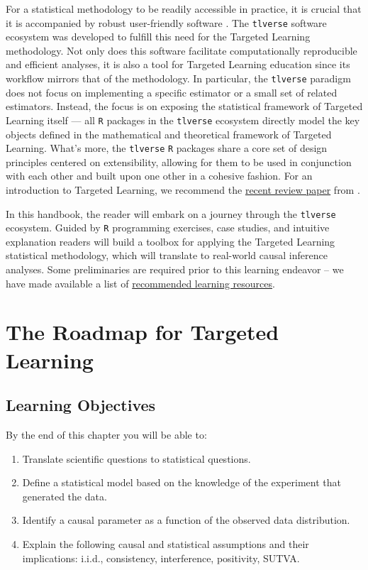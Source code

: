 \documentclass[12pt, krantz2,]{krantz}
\providecommand{\tightlist}{%
  \setlength{\itemsep}{0pt}\setlength{\parskip}{0pt}}
\theoremstyle{definition}
\theoremstyle{definition}
\theoremstyle{definition}
\newcommand{\1}{\mathbbm{1}}
\begin{document}
For a statistical methodology to be readily accessible in practice, it is
crucial that it is accompanied by robust user-friendly software
\citep{pullenayegum2016knowledge, stromberg2004write}. The \texttt{tlverse} software
ecosystem was developed to fulfill this need for the Targeted Learning
methodology. Not only does this software facilitate computationally reproducible
and efficient analyses, it is also a tool for Targeted Learning education since
its workflow mirrors that of the methodology. In particular, the \texttt{tlverse}
paradigm does not focus on implementing a specific estimator or a small set of
related estimators. Instead, the focus is on exposing the statistical framework
of Targeted Learning itself --- all \texttt{R} packages in the \texttt{tlverse} ecosystem
directly model the key objects defined in the mathematical and theoretical
framework of Targeted Learning. What's more, the \texttt{tlverse} \texttt{R} packages share a
core set of design principles centered on extensibility, allowing for them to be
used in conjunction with each other and built upon one other in a cohesive
fashion. For an introduction to Targeted Learning, we recommend the \href{https://arxiv.org/abs/2006.07333}{recent
review paper} from \citet{coyle2021targeted}.

In this handbook, the reader will embark on a journey through the \texttt{tlverse}
ecosystem. Guided by \texttt{R} programming exercises, case studies, and
intuitive explanation readers will build a toolbox for applying the Targeted
Learning statistical methodology, which will translate to real-world causal
inference analyses. Some preliminaries are required prior to this learning
endeavor -- we have made available a list of \protect\hyperlink{learn}{recommended learning
resources}.

\hypertarget{intro}{%
\section{The Roadmap for Targeted Learning}\label{intro}}

\hypertarget{learning-objectives}{%
\subsection*{Learning Objectives}\label{learning-objectives}}


By the end of this chapter you will be able to:

\begin{enumerate}
\def\labelenumi{\arabic{enumi}.}
\tightlist
\item
  Translate scientific questions to statistical questions.
\item
  Define a statistical model based on the knowledge of the experiment that
  generated the data.
\item
  Identify a causal parameter as a function of the observed data distribution.
\item
  Explain the following causal and statistical assumptions and their
  implications: i.i.d., consistency, interference, positivity, SUTVA.
\end{enumerate}
\end{document}
